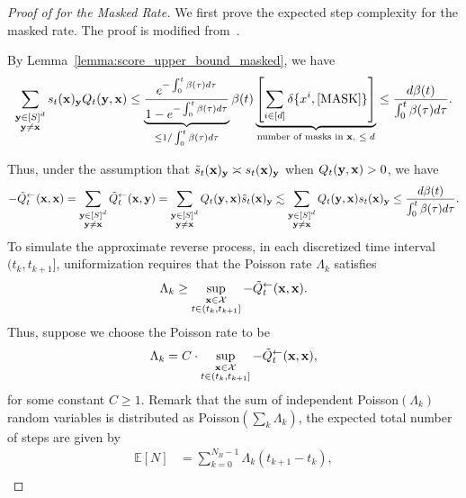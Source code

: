 \documentclass{article} %
\newcommand{\bfx}{{\bf x}}
\newcommand{\bfy}{ {\bf y}}
\newcommand{\mask}{\text{[MASK]}}
\begin{document}
\begin{proof}[Proof of  for the Masked Rate] We first prove the expected step complexity for the masked rate.
The proof is modified from~\cite[Theorem~3]{liang2026absorb}.

    By Lemma~\ref{lemma:score_upper_bound_masked}, we have
    \[
    \sum_{\substack{\bfy\in {[S]^d} \\ \bfy\neq \bfx}}  s_t(\bfx)_\bfy Q_t(\bfy, \bfx) \leq \underbrace{\frac{e^{-\int_0^t \beta(\tau) d\tau}}{1-e^{-\int_0^t \beta(\tau) d\tau}}}_{\leq 1/\int_0^t \beta(\tau) d\tau} \beta(t) \underbrace{\left[ \sum_{i \in [d]} \delta\{x^i, \mask\} \right]}_{\text{number of masks in $\bfx$, $\leq d$}} \leq \frac{d \beta(t)}{\int_0^t \beta(\tau) d\tau}.
    \]

    Thus, under the assumption that $\tilde{s}_{t}(\bfx)_\bfy \asymp s_{t}(\bfx)_\bfy$ when $Q_t(\bfy, \bfx) > 0$, we have
    \begin{equation}\label{eq:sQ_bound}
    -\tilde{Q}_{t}^{\leftarrow}(\bfx, \bfx) = \sum_{\substack{\bfy\in{[S]^d} \\ \bfy\neq \bfx}} \tilde{Q}_{t}^{\leftarrow}(\bfx, \bfy) = \sum_{\substack{\bfy\in{[S]^d} \\ \bfy\neq \bfx}} Q_t(\bfy, \bfx) \tilde{s}_t(\bfx)_\bfy \lesssim \sum_{\substack{\bfy\in{[S]^d} \\ \bfy\neq \bfx}} Q_t(\bfy, \bfx) {s}_t(\bfx)_\bfy \leq \frac{d \beta(t)}{\int_0^t \beta(\tau) d\tau}.
    \end{equation}
    To simulate the approximate reverse process, in each discretized time interval $(t_k, t_{k+1}]$, uniformization requires that the Poisson rate $\Lambda_k$ satisfies
    \[
        \Lambda_k \geq \sup_{\substack{\bfx \in \mathcal{X} \\ t \in (t_k, t_{k+1}]}} -\tilde{Q}^{\leftarrow}_t (\bfx, \bfx).
    \]
    Thus, suppose we choose the Poisson rate to be
    \begin{equation}\label{eq:Pois_rate_bound}
        \Lambda_k = C \cdot \sup_{\substack{\bfx \in \mathcal{X} \\ t \in (t_k, t_{k+1}]}} -\tilde{Q}^{\leftarrow}_t (\bfx, \bfx),
    \end{equation}
    for some constant $C \geq 1$.
    Remark that the sum of independent Poisson$(\Lambda_k)$ random variables is distributed as Poisson$(\sum_k \Lambda_k)$, the expected total number of steps are given by
    \begin{align}
        \mathbb{E}[N] &= \sum_{k=0}^{N_B-1} \Lambda_k (t_{k+1}-t_k), \nonumber \\

\end{align}
\end{proof}
\end{document}
